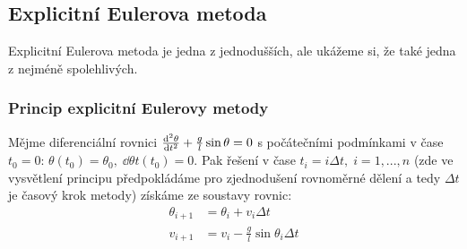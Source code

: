 \documentclass[reqno, a4paper]{amsart}
\begin{document}
\subsection{Explicitní Eulerova metoda}
Explicitní Eulerova metoda je jedna z jednodušších, ale ukážeme si, že také jedna z nejméně spolehlivých.
\\
\subsubsection{Princip explicitní Eulerovy metody} Mějme diferenciální rovnici $\frac{\mathrm{d}^2 {\theta}}{\mathrm{d} {t}^2} + \frac{g}{l} \sin \theta = 0$ s počátečními podmínkami v čase $t_{0}=0$: $\theta(t_{0})=\theta_{0},\; \dd{\theta}{t}(t_{0})=0$. Pak řešení v čase $t_{i}=i\Delta t,\; i=1,...,n$ (zde ve vysvětlení principu předpokládáme pro zjednodušení rovnoměrné dělení a tedy $ \Delta t$ je časový krok metody) získáme ze soustavy rovnic: 
\begin{align}
	\theta_{i+1}& =\theta_{i}+v_{i}\Delta t\\
	v_{i+1}& =v_{i}-\frac{g}{l}\sin\theta_{i}\Delta t
\end{align}
\end{document}
